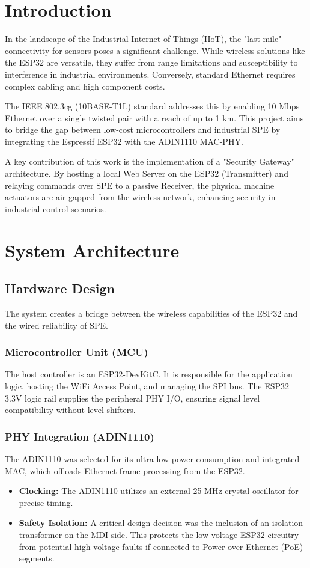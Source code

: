 \documentclass[conference]{IEEEtran}
\begin{document}
	\section{Introduction}
	In the landscape of the Industrial Internet of Things (IIoT), the "last mile" connectivity for sensors poses a significant challenge. While wireless solutions like the ESP32 are versatile, they suffer from range limitations and susceptibility to interference in industrial environments. Conversely, standard Ethernet requires complex cabling and high component costs. 
	
	The IEEE 802.3cg (10BASE-T1L) standard addresses this by enabling 10 Mbps Ethernet over a single twisted pair with a reach of up to 1 km. This project aims to bridge the gap between low-cost microcontrollers and industrial SPE by integrating the Espressif ESP32 with the ADIN1110 MAC-PHY. 
	
	A key contribution of this work is the implementation of a "Security Gateway" architecture. By hosting a local Web Server on the ESP32 (Transmitter) and relaying commands over SPE to a passive Receiver, the physical machine actuators are air-gapped from the wireless network, enhancing security in industrial control scenarios.
	
	\section{System Architecture}
	
	\subsection{Hardware Design}
	The system creates a bridge between the wireless capabilities of the ESP32 and the wired reliability of SPE.
	
	\subsubsection{Microcontroller Unit (MCU)}
	The host controller is an ESP32-DevKitC. It is responsible for the application logic, hosting the WiFi Access Point, and managing the SPI bus. The ESP32 3.3V logic rail supplies the peripheral PHY I/O, ensuring signal level compatibility without level shifters.
	
	\subsubsection{PHY Integration (ADIN1110)}
	The ADIN1110 was selected for its ultra-low power consumption and integrated MAC, which offloads Ethernet frame processing from the ESP32.
	\begin{itemize}
		\item \textbf{Clocking:} The ADIN1110 utilizes an external 25 MHz crystal oscillator for precise timing.
		\item \textbf{Safety Isolation:} A critical design decision was the inclusion of an isolation transformer on the MDI side. This protects the low-voltage ESP32 circuitry from potential high-voltage faults if connected to Power over Ethernet (PoE) segments.
	\end{itemize}
	
\end{document}
